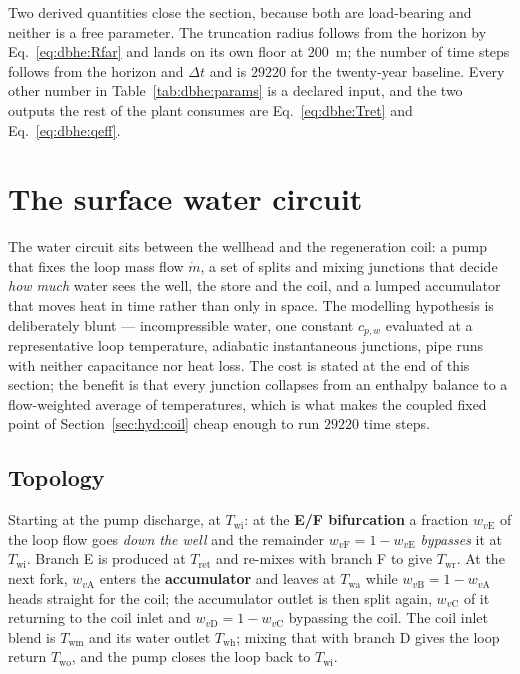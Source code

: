 \documentclass[11pt]{article}
\newcommand{\md}{\ensuremath{\dot m}}
\begin{document}
Two derived quantities close the section, because both are load-bearing and
neither is a free parameter. The truncation radius follows from the horizon by
Eq.~\eqref{eq:dbhe:Rfar} and lands on its own floor at \SI{200}{\metre}; the
number of time steps follows from the horizon and $\Delta t$ and is
$\num{29220}$ for the twenty-year baseline. Every other number in
Table~\ref{tab:dbhe:params} is a declared input, and the two outputs the rest of
the plant consumes are Eq.~\eqref{eq:dbhe:Tret} and Eq.~\eqref{eq:dbhe:qeff}.

\section{The surface water circuit}
\label{sec:hyd:circuit}

The water circuit sits between the wellhead and the regeneration coil: a pump that fixes the
loop mass flow $\md$, a set of splits and mixing junctions that decide \emph{how much} water
sees the well, the store and the coil, and a lumped accumulator that moves heat in time rather
than only in space. The modelling hypothesis is deliberately blunt --- incompressible water,
one constant $c_{p,w}$ evaluated at a representative loop temperature, adiabatic instantaneous
junctions, pipe runs with neither capacitance nor heat loss. The cost is stated at the end of
this section; the benefit is that every junction collapses from an enthalpy balance to a
flow-weighted average of temperatures, which is what makes the coupled fixed point of
Section~\ref{sec:hyd:coil} cheap enough to run $\num{29220}$ time steps.

\subsection{Topology}
\label{sec:hyd:topology}

Starting at the pump discharge, at $T_{\mathrm{wi}}$: at the \textbf{E/F bifurcation} a
fraction $w_{v\mathrm{E}}$ of the loop flow goes \emph{down the well} and the remainder
$w_{v\mathrm{F}}=1-w_{v\mathrm{E}}$ \emph{bypasses} it at $T_{\mathrm{wi}}$. Branch E is
produced at $T_{\mathrm{ret}}$ and re-mixes with branch F to give $T_{\mathrm{wr}}$. At the
next fork, $w_{v\mathrm{A}}$ enters the \textbf{accumulator} and leaves at $T_{\mathrm{wa}}$
while $w_{v\mathrm{B}}=1-w_{v\mathrm{A}}$ heads straight for the coil; the accumulator outlet
is then split again, $w_{v\mathrm{C}}$ of it returning to the coil inlet and
$w_{v\mathrm{D}}=1-w_{v\mathrm{C}}$ bypassing the coil. The coil inlet blend is
$T_{\mathrm{wm}}$ and its water outlet $T_{\mathrm{wh}}$; mixing that with branch D gives the
loop return $T_{\mathrm{wo}}$, and the pump closes the loop back to $T_{\mathrm{wi}}$.
\end{document}
